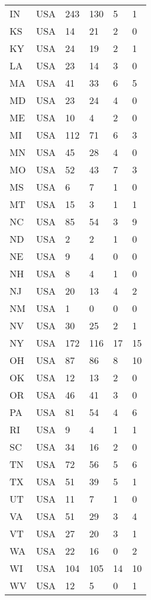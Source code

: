 \begin{supertabular}{llllll}
      IN &              USA &  243 &  130 &   5 &   1 \\
      KS &              USA &   14 &   21 &   2 &   0 \\
      KY &              USA &   24 &   19 &   2 &   1 \\
      LA &              USA &   23 &   14 &   3 &   0 \\
      MA &              USA &   41 &   33 &   6 &   5 \\
      MD &              USA &   23 &   24 &   4 &   0 \\
      ME &              USA &   10 &    4 &   2 &   0 \\
      MI &              USA &  112 &   71 &   6 &   3 \\
      MN &              USA &   45 &   28 &   4 &   0 \\
      MO &              USA &   52 &   43 &   7 &   3 \\
      MS &              USA &    6 &    7 &   1 &   0 \\
      MT &              USA &   15 &    3 &   1 &   1 \\
      NC &              USA &   85 &   54 &   3 &   9 \\
      ND &              USA &    2 &    2 &   1 &   0 \\
      NE &              USA &    9 &    4 &   0 &   0 \\
      NH &              USA &    8 &    4 &   1 &   0 \\
      NJ &              USA &   20 &   13 &   4 &   2 \\
      NM &              USA &    1 &    0 &   0 &   0 \\
      NV &              USA &   30 &   25 &   2 &   1 \\
      NY &              USA &  172 &  116 &  17 &  15 \\
      OH &              USA &   87 &   86 &   8 &  10 \\
      OK &              USA &   12 &   13 &   2 &   0 \\
      OR &              USA &   46 &   41 &   3 &   0 \\
      PA &              USA &   81 &   54 &   4 &   6 \\
      RI &              USA &    9 &    4 &   1 &   1 \\
      SC &              USA &   34 &   16 &   2 &   0 \\
      TN &              USA &   72 &   56 &   5 &   6 \\
      TX &              USA &   51 &   39 &   5 &   1 \\
      UT &              USA &   11 &    7 &   1 &   0 \\
      VA &              USA &   51 &   29 &   3 &   4 \\
      VT &              USA &   27 &   20 &   3 &   1 \\
      WA &              USA &   22 &   16 &   0 &   2 \\
      WI &              USA &  104 &  105 &  14 &  10 \\
      WV &              USA &   12 &    5 &   0 &   1 \\
\end{supertabular}
